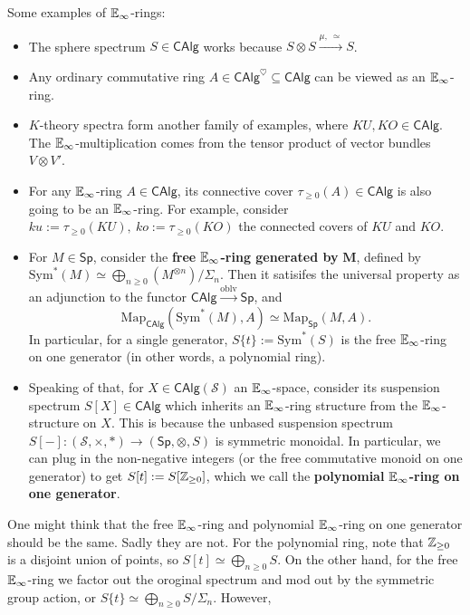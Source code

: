 \begin{example}
    Some examples of $\mathbb{E}_{\infty}$-rings:
    \begin{itemize}
    \setlength\itemsep{-.2em}
        \item The sphere spectrum $S \in \mathsf{CAlg} $ works because $S\otimes S \xrightarrow{\mu,\ \simeq } S$.
        \item Any ordinary commutative ring $A \in \mathsf{CAlg}^{\heartsuit} \subseteq \mathsf{CAlg}  $ can be viewed as an $\mathbb{E}_{\infty}$-ring.
        \item $K$-theory spectra form another family of examples, where $KU,KO \in \mathsf{CAlg} $. The $\mathbb{E}_{\infty}$-multiplication comes from the tensor product of vector bundles $V\otimes V'$.
        \item For any $\mathbb{E}_{\infty}$-ring $A \in \mathsf{CAlg} $, its connective cover $\tau _{\geq 0}(A) \in \mathsf{CAlg} $ is also going to be an $\mathbb{E}_{\infty}$-ring. For example, consider $ku:=\tau _{\geq 0}(KU),\ ko:=\tau _{\geq 0}(KO)$ the connected covers of $KU$ and $KO$.
        \item For $M \in \mathsf{Sp} $, consider the \textbf{free} $\mathbb{E}_{\infty}$\textbf{-ring generated by} $\mathbf M$, defined by $\mathrm{Sym}^*(M) \simeq  \bigoplus _{n \geq 0}(M^{\otimes n}) / \Sigma_n $. Then it satisifes the universal property as an adjunction to the functor $\mathsf{CAlg} \xrightarrow{\mathrm{oblv}} \mathsf{Sp} $, and \[
                \mathrm{Map}_{\mathsf{CAlg} }(\mathrm{Sym}^*(M),A) \simeq  \mathrm{Map}_{\mathsf{Sp} }(M,A).
            \] In particular, for a single generator, $S \{t\} :=\mathrm{Sym}^*(S)$ is the free $\mathbb{E}_{\infty}$-ring on one generator (in other words, a polynomial ring).
        \item Speaking of that, for $X \in \mathsf{CAlg} (\mathcal{S} )$ an $\mathbb{E}_{\infty}$-space, consider its suspension spectrum $S[X] \in \mathsf{CAlg} $ which inherits an $\mathbb{E}_{\infty}$-ring structure from the $\mathbb{E}_{\infty}$-structure on $X$. This is because the unbased suspension spectrum $S[-] \colon (\mathcal{S} , \times , *)  \to (\mathsf{Sp} , \otimes, S)$ is symmetric monoidal. In particular, we can plug in the non-negative integers (or the free commutative monoid on one generator) to get $S[t]:= S[\mathbb{Z}_{\geq 0}]$, which we call the \textbf{polynomial} $\mathbb{E}_{\infty}$\textbf{-ring on one generator}.
    \end{itemize}
    One might think that the free $\mathbb{E}_{\infty}$-ring and polynomial $\mathbb{E}_{\infty}$-ring on one generator should be the same. Sadly they are not. For the polynomial ring, note that $\mathbb{Z} _{\geq 0}$ is a disjoint union of points, so $S[t]\simeq  \bigoplus _{n \geq 0}S $. On the other hand, for the free $\mathbb{E}_{\infty}$-ring we factor out the oroginal spectrum and mod out by the symmetric group action, or $S \{t\} \simeq  \bigoplus _{n\geq 0}S / \Sigma_n $. However, \[
\]
\end{example}
